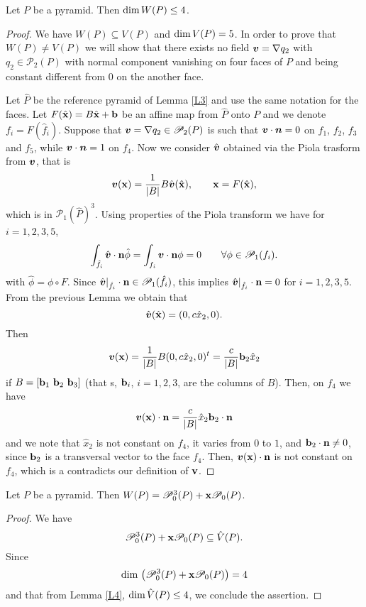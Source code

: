 \begin{lemma}\label{L4}
Let $P$ be a pyramid. Then $\mbox{dim\,}W(P)\le4$.
\end{lemma}
\begin{proof}
We have $W(P)\subseteq V(P)$ and $\mbox{dim\,}V(P)=5$. In order to prove that $W(P)\ne
V(P)$ we will show that there exists no field
$\boldsymbol{v}=\nabla q_2$ with $q_2\in \mathcal P_2(P)$ with normal
component vanishing on four faces of $P$ and being constant different from $0$ on
the another face.

Let $\hat P$ be the reference pyramid of Lemma \ref{L3} and
use the same notation for the faces. Let $F(\hat {\bf x})=B\hat
{\bf x} + {\bf b}$ be an affine map from $\hat P$ onto $P$ and we denote
$f_i=F(\hat f_i)$. Suppose
that $\boldsymbol{v}=\nabla q_2\in \mathcal P_2(P)$ is such that
$\boldsymbol{v}\cdot\boldsymbol{n}=0$ on $f_1$, $f_2$, $f_3$ and $f_5$, while
$\boldsymbol{v}\cdot\boldsymbol{n}=1$ on $f_4$. Now we consider $\hat{\boldsymbol{v}}$
obtained via the Piola trasform from $\boldsymbol{v}$, that is
\begin{equation}\label{piola}
\boldsymbol{v}({\bf x}) = \frac1{|B|}B\hat{\boldsymbol{v}}(\hat{\bf x}), \qquad {\bf x}=F(\hat {\bf x}),
\end{equation}
which is in $\mathcal P_1(\hat P)^3$. Using properties of the Piola transform
\cite[pages 12--14]{ricardoMixed} we have for $i=1,2,3,5$,
\[
\int_{\hat f_i}\hat {\boldsymbol{v}}\cdot {\bf n}\hat\phi = \int_{f_i}\boldsymbol{v}\cdot {\bf n}\phi =0\qquad \forall \phi\in\mathcal P_1(f_i).
\]
with $\hat \phi = \phi\circ F$. Since $\hat{\boldsymbol{v}}|_{\hat f_i}\cdot {\bf n}\in\mathcal P_1(\hat f_i)$, this implies $\hat{\boldsymbol{v}}|_{\hat f_i}\cdot {\bf n}=0$ for $i=1,2,3,5$. From the previous Lemma we obtain that
\[
\hat{\boldsymbol{v}}(\hat{\bf x})=(0,c\hat x_2,0).
\]
Then
\[
\boldsymbol{v}({\bf x})=\frac1{|B|}B(0,c\hat x_2,0)^t = \frac c{|B|}{\bf b}_2 \hat x_2
\]
if $B=[{\bf b}_1\,\,{\bf b}_2\,\,{\bf b}_3]$ (that s, ${\bf b}_i$, $i=1,2,3$,  are the columns of $B$). Then, on $f_4$ we have 
\[
\boldsymbol{v}({\bf x})\cdot {\bf n}=\frac c{|B|}\hat x_2{\bf b}_2\cdot {\bf n} 
\]
and we note that $\hat x_2$ is not constant on $f_4$, it varies from $0$ to $1$, and ${\bf b}_2\cdot {\bf n}\ne 0$, since ${\bf b}_2$ is a transversal vector to the face $f_4$. Then, $\boldsymbol{v}({\bf x})\cdot {\bf n}$ is not constant on $f_4$, which is a contradicts our definition of $\bf v$.  
\end{proof}

\begin{proposition}
Let $P$ be a pyramid. Then $W(P)=\mathcal
P_0^3(P)+{\bf x}\mathcal P_0(P)$.
\end{proposition}
\begin{proof}
We have
\[
\mathcal P_0^3(P)+{\bf x}\mathcal P_0(P)\subseteq \hat
V(P).
\]
Since
\[
\mbox{dim\,}\left(\mathcal P_0^3(P)+{\bf x}\mathcal
P_0(P)\right)=4
\]
and that from Lemma \ref{L4}, $\mbox{dim\,}\hat
V(P)\le4$, we conclude the assertion.
\end{proof}

